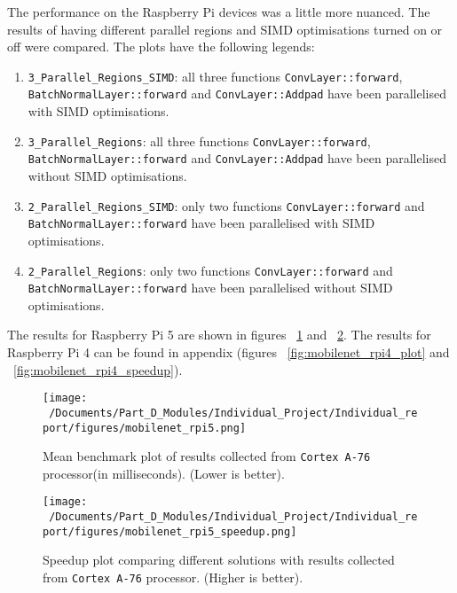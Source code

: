 The performance on the Raspberry Pi devices was a little more nuanced. The results of having different parallel regions and SIMD optimisations turned on or off were compared. The plots have the following legends:

\begin{enumerate}
	\item \texttt{3\_Parallel\_Regions\_SIMD}: all three functions \texttt{ConvLayer::forward}, \texttt{BatchNormalLayer::forward} and \texttt{ConvLayer::Addpad} have been parallelised with SIMD optimisations.
	\item \texttt{3\_Parallel\_Regions}: all three functions \texttt{ConvLayer::forward}, \texttt{BatchNormalLayer::forward} and \texttt{ConvLayer::Addpad} have been parallelised without SIMD optimisations.
	\item \texttt{2\_Parallel\_Regions\_SIMD}: only two functions \texttt{ConvLayer::forward} and \texttt{BatchNormalLayer::forward} have been parallelised with SIMD optimisations.
	\item \texttt{2\_Parallel\_Regions}: only two functions \texttt{ConvLayer::forward} and \texttt{BatchNormalLayer::forward} have been parallelised without SIMD optimisations.
\end{enumerate}

The results for Raspberry Pi 5 are shown in figures ~\ref{fig:mobilenet_rpi5_plot} and ~\ref{fig:mobilenet_rpi5_speedup}. The results for Raspberry Pi 4 can be found in appendix (figures ~\ref{fig:mobilenet_rpi4_plot} and ~\ref{fig:mobilenet_rpi4_speedup}). 

\begin{figure}[htbp] %
	\centering
	\texttt{[image: ~/Documents/Part\_D\_Modules/Individual\_Project/Individual\_report/figures/mobilenet\_rpi5.png]} %
	\caption{Mean benchmark plot of results collected from \texttt{Cortex A-76} processor(in milliseconds). (Lower is better).}
	\label{fig:mobilenet_rpi5_plot} %
\end{figure}

\begin{figure}[htbp] %
	\centering
	\texttt{[image: ~/Documents/Part\_D\_Modules/Individual\_Project/Individual\_report/figures/mobilenet\_rpi5\_speedup.png]} %
	\caption{Speedup plot comparing different solutions with results collected from \texttt{Cortex A-76} processor. (Higher is better).}
	\label{fig:mobilenet_rpi5_speedup} %
\end{figure}


